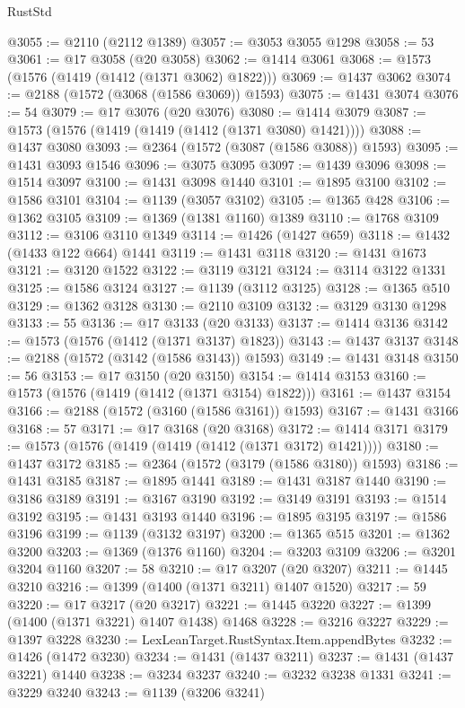 \begin{lexlean}{RustStd}
\begin{coremodule}
@3055 := @2110 (@2112 @1389)
@3057 := @3053 @3055 @1298
@3058 := 53
@3061 := @17 @3058 (@20 @3058)
@3062 := @1414 @3061
@3068 := @1573 (@1576 (@1419 (@1412 (@1371 @3062) @1822)))
@3069 := @1437 @3062
@3074 := @2188 (@1572 (@3068 (@1586 @3069)) @1593)
@3075 := @1431 @3074
@3076 := 54
@3079 := @17 @3076 (@20 @3076)
@3080 := @1414 @3079
@3087 := @1573 (@1576 (@1419 (@1419 (@1412 (@1371 @3080) @1421))))
@3088 := @1437 @3080
@3093 := @2364 (@1572 (@3087 (@1586 @3088)) @1593)
@3095 := @1431 @3093 @1546
@3096 := @3075 @3095
@3097 := @1439 @3096
@3098 := @1514 @3097
@3100 := @1431 @3098 @1440
@3101 := @1895 @3100
@3102 := @1586 @3101
@3104 := @1139 (@3057 @3102)
@3105 := @1365 @428
@3106 := @1362 @3105
@3109 := @1369 (@1381 @1160) @1389
@3110 := @1768 @3109
@3112 := @3106 @3110 @1349
@3114 := @1426 (@1427 @659)
@3118 := @1432 (@1433 @122 @664) @1441
@3119 := @1431 @3118
@3120 := @1431 @1673
@3121 := @3120 @1522
@3122 := @3119 @3121
@3124 := @3114 @3122 @1331
@3125 := @1586 @3124
@3127 := @1139 (@3112 @3125)
@3128 := @1365 @510
@3129 := @1362 @3128
@3130 := @2110 @3109
@3132 := @3129 @3130 @1298
@3133 := 55
@3136 := @17 @3133 (@20 @3133)
@3137 := @1414 @3136
@3142 := @1573 (@1576 (@1412 (@1371 @3137) @1823))
@3143 := @1437 @3137
@3148 := @2188 (@1572 (@3142 (@1586 @3143)) @1593)
@3149 := @1431 @3148
@3150 := 56
@3153 := @17 @3150 (@20 @3150)
@3154 := @1414 @3153
@3160 := @1573 (@1576 (@1419 (@1412 (@1371 @3154) @1822)))
@3161 := @1437 @3154
@3166 := @2188 (@1572 (@3160 (@1586 @3161)) @1593)
@3167 := @1431 @3166
@3168 := 57
@3171 := @17 @3168 (@20 @3168)
@3172 := @1414 @3171
@3179 := @1573 (@1576 (@1419 (@1419 (@1412 (@1371 @3172) @1421))))
@3180 := @1437 @3172
@3185 := @2364 (@1572 (@3179 (@1586 @3180)) @1593)
@3186 := @1431 @3185
@3187 := @1895 @1441
@3189 := @1431 @3187 @1440
@3190 := @3186 @3189
@3191 := @3167 @3190
@3192 := @3149 @3191
@3193 := @1514 @3192
@3195 := @1431 @3193 @1440
@3196 := @1895 @3195
@3197 := @1586 @3196
@3199 := @1139 (@3132 @3197)
@3200 := @1365 @515
@3201 := @1362 @3200
@3203 := @1369 (@1376 @1160)
@3204 := @3203 @3109
@3206 := @3201 @3204 @1160
@3207 := 58
@3210 := @17 @3207 (@20 @3207)
@3211 := @1445 @3210
@3216 := @1399 (@1400 (@1371 @3211) @1407 @1520)
@3217 := 59
@3220 := @17 @3217 (@20 @3217)
@3221 := @1445 @3220
@3227 := @1399 (@1400 (@1371 @3221) @1407 @1438) @1468
@3228 := @3216 @3227
@3229 := @1397 @3228
@3230 := LexLeanTarget.RustSyntax.Item.appendBytes
@3232 := @1426 (@1472 @3230)
@3234 := @1431 (@1437 @3211)
@3237 := @1431 (@1437 @3221) @1440
@3238 := @3234 @3237
@3240 := @3232 @3238 @1331
@3241 := @3229 @3240
@3243 := @1139 (@3206 @3241)

\end{coremodule}
\end{lexlean}
